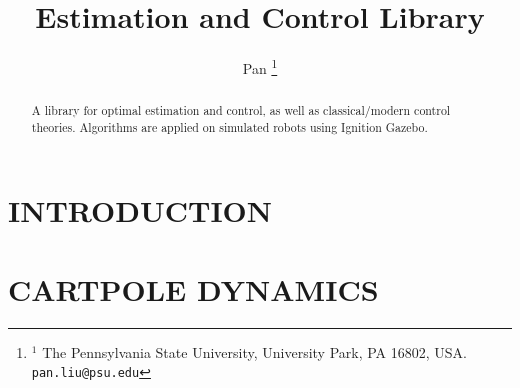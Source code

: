 \documentclass[letterpaper, 10 pt, conference]{ieeeconf}  %
\title{\LARGE \bf
Estimation and Control Library}
\author{Pan %
\thanks{$^{1}$ The Pennsylvania State University, University Park, PA 16802, USA.
        {\tt\small pan.liu@psu.edu}}%
}
\begin{document}
\maketitle
\thispagestyle{empty}
\pagestyle{empty}


\begin{abstract}
A library for optimal estimation and control, as well as classical/modern control theories. Algorithms are applied on simulated robots using Ignition Gazebo.
\end{abstract}


\section{INTRODUCTION} \label{introsec}


\section{CARTPOLE DYNAMICS} \label{carpoledyn}




\end{document}
